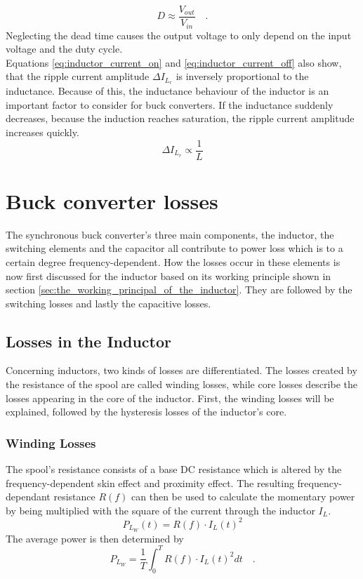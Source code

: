 \begin{equation}\label{eq:duty_cycle}
    D \approx \frac{V_{out}}{V_{in}} \quad\text{.}
\end{equation}
Neglecting the dead time causes the output voltage to only depend on the input voltage and the duty cycle\cite{depewEfficiencyAnalysisSynchronous2012}.\\
Equations \ref{eq:inductor_current_on} and \ref{eq:inductor_current_off} also show, that the ripple current amplitude $\Delta I_{L_r}$ is inversely proportional to the inductance. Because of this, the inductance behaviour of the inductor is an important factor to consider for buck converters. If the inductance suddenly decreases, because the induction reaches saturation, the ripple current amplitude increases quickly. 
\begin{equation}\label{eq:inductance_ripple_current}
    \Delta I_{L_r} \propto \frac{1}{L}
\end{equation}

\section{Buck converter losses}\label{sec:losses_in_bc}
The synchronous buck converter's three main components, the inductor, the switching elements and the capacitor all contribute to power loss which is to a certain degree frequency-dependent. How the losses occur in these elements is now first discussed for the inductor based on its working principle shown in section \ref{sec:the_working_principal_of_the_inductor}. They are followed by the switching losses and lastly the capacitive losses.
\subsection{Losses in the Inductor} \label{sec:losses_in_the_inductor}
Concerning inductors, two kinds of losses are differentiated. The losses created by the resistance of the spool are called winding losses, while core losses describe the losses appearing in the core of the inductor. First, the winding losses will be explained, followed by the hysteresis losses of the inductor's core.

\subsubsection{Winding Losses}
The spool's resistance consists of a base DC resistance which is altered by the frequency-dependent skin effect and proximity effect. The resulting frequency-dependant resistance $R(f)$ can then be used to calculate the momentary power by being multiplied with the square of the current through the inductor $I_L$. 
\begin{equation}
    P_{L_{W}}(t) = R(f) \cdot I_L(t)^2
\end{equation}
The average power is then determined by 
\begin{equation}
    P_{L_{W}} = \frac{1}{T} \int_{0}^{T} R(f) \cdot I_L(t)^2 dt   \quad\text{.}
\end{equation}

